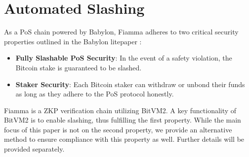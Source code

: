 \section{Automated Slashing} \label{sec:automated-slashing}

As a PoS chain powered by Babylon, Fiamma adheres to two critical security properties outlined in the Babylon litepaper \cite{website:litepaper}:

\begin{itemize}
    \item \textbf{Fully Slashable PoS Security}: In the event of a safety violation, the Bitcoin stake is guaranteed to be slashed.
    \item \textbf{Staker Security}: Each Bitcoin staker can withdraw or unbond their funds as long as they adhere to the PoS protocol honestly.
\end{itemize}

Fiamma is a ZKP verification chain utilizing BitVM2. A key functionality of BitVM2 is to enable slashing, thus fulfilling the first property. While the main focus of this paper is not on the second property, we provide an alternative method to ensure compliance with this property as well. Further details will be provided separately.


